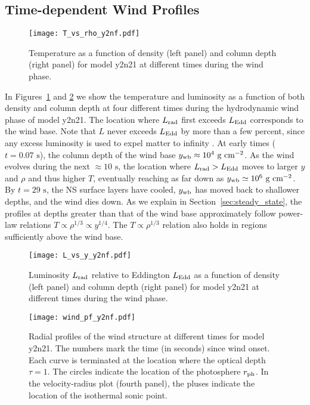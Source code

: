 \documentclass[apj,usenatbib, iop, twocolappendix]{emulateapj}
\newcommand{\Lrad}{L_{\rm rad}}
\newcommand{\Ledd}{L_{\rm Edd}}
\newcommand{\trm}[1]{\textrm{#1}}
\begin{document}
\subsection{Time-dependent Wind Profiles}
\label{sec:wind_profiles}


\begin{figure}
\texttt{[image: T\_vs\_rho\_y2nf.pdf]}
\caption{Temperature as a function of density (left panel) and column depth (right panel) for model y2n21 at different times during the wind phase.}
\label{fig:T_vs_rho_y2n21}
\end{figure}

In Figures~\ref{fig:T_vs_rho_y2n21} and \ref{fig:L_vs_y_y2n21} we show  the temperature and luminosity  as a function of both density and column depth at four different times during the hydrodynamic wind phase of model y2n21.    The location where $\Lrad$ first exceeds $L_{\rm Edd}$ corresponds to the wind base. Note that $L$ never exceeds $L_{\rm Edd}$ by more than a few percent, since any excess luminosity is used to expel matter to infinity \citep{Ebisuzaki:83,Kato:83,Paczynski:86}.  At early times ($t=0.07\trm{ s}$), the column depth of the wind base $y_{\rm wb}\approx 10^4\trm{ g cm}^{-2}$.  As the wind evolves during the next $\approx 10\trm{ s}$,  the location where $\Lrad>L_{\rm Edd}$ moves to larger $y$ and $\rho$ and thus higher $T$, eventually reaching as far down as $y_{\rm wb}\simeq 10^6\trm{ g cm}^{-2}$.    By $t=29\trm{ s}$, the NS surface layers have cooled, $y_{\rm wb}$ has moved back to shallower depths, and the wind dies down.   As we explain in Section~\ref{sec:steady_state}, the profiles at depths greater than that of the wind base approximately follow power-law relations $T\propto\rho^{1/3}\propto y^{1/4}$. The $T\propto \rho^{1/3}$ relation also holds in regions sufficiently above the wind base.


 \begin{figure}
\texttt{[image: L\_vs\_y\_y2nf.pdf]}
\caption{Luminosity $\Lrad$ relative to Eddington $\Ledd$ as a  function of density (left panel) and column depth (right panel) for model y2n21 at different times during the wind phase. }
\label{fig:L_vs_y_y2n21}
\end{figure}


\begin{figure}
\texttt{[image: wind\_pf\_y2nf.pdf]}
\caption{Radial profiles of the wind structure at different times for model y2n21. The numbers mark the time (in seconds) since wind onset. Each curve is terminated at the location where the optical depth $\tau=1$. The circles indicate the location of the photosphere $r_{\rm ph}$. In the velocity-radius plot (fourth panel), the pluses  indicate the location of the isothermal sonic point.  
}
\label{fig:wind_pf_y2n21}
\end{figure}
\end{document}
